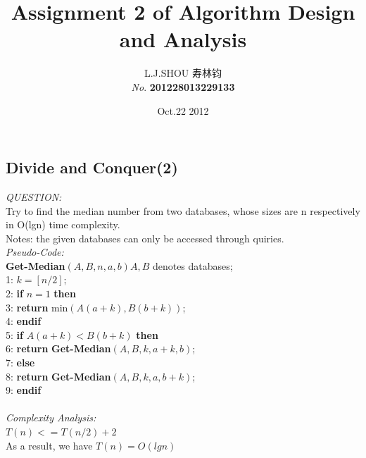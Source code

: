 \documentclass[11pt]{article}
\begin{document}
\begin{CJK}{UTF8}{gbsn}
\title{ \textbf{Assignment 2 of Algorithm Design and Analysis}}
\author{L.J.SHOU  寿林钧\\{\slshape No}. \bf 201228013229133}
\date{Oct.22 2012}
\maketitle %
\section{Divide and Conquer(2)}
{\em \sf QUESTION:}\\[1mm]
Try to find the median number from two databases, whose sizes are n respectively in O(lgn) time complexity. \\
{\footnotesize Notes: the given databases can only be accessed through quiries.}\\[1mm]
{\em \sf Pseudo-Code:}\\[1mm]
{\bf {\bf Get-Median}}$(A,B,n,a,b) A, B$ denotes databases;\\
 1: $k=[n/2];$                                 \\
 2: {\bf if} $n=1$ {\bf then}                             \\ 
 3:          {\bf return} min$(A(a+k),B(b+k))$;\\
 4: {\bf endif}\\
 5: {\bf if} $A(a+k)<B(b+k)$ {\bf then}\\
 6:          {\bf return} {\bf Get-Median}$(A,B,k,a+k,b)$;\\
 7: {\bf else}\\
 8:          {\bf return} {\bf Get-Median}$(A,B,k,a,b+k)$;\\
 9: {\bf {\bf endif}}\\
 \\
{\em \sf Complexity Analysis:}\\[1mm]
$T(n)<=T(n/2)+2$\\
As a result, we have $T(n)=O(lgn)$\\


\end{CJK}
\end{document}
